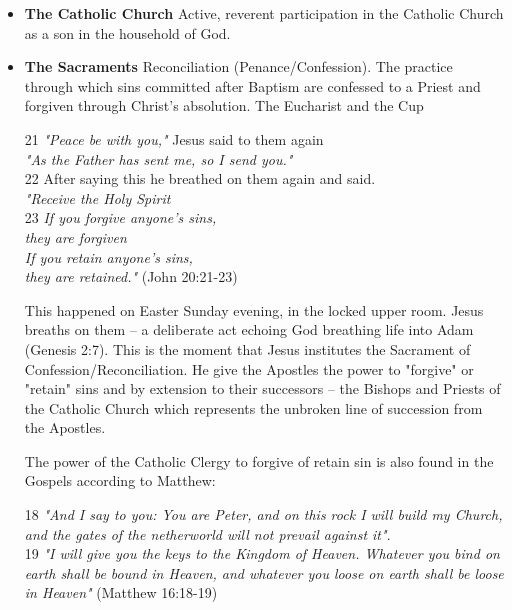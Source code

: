\documentclass[12pt,a4paper]{book}
\begin{document}
\begin{itemize}
\item \textbf{The Catholic Church} Active, reverent participation in the Catholic Church as a son in the household of God.

\item \textbf{The Sacraments} Reconciliation (Penance/Confession).  The practice through which sins committed after Baptism are confessed to a Priest and forgiven through Christ's absolution.  The Eucharist and the Cup

21 \textit{"Peace be with you,"} Jesus said to them again \\ 
\hspace*{10pt} \textit{"As the Father has sent me, so I send you."}\\
22 After saying this he breathed on them again and said. \\
\hspace*{10pt} \textit{"Receive the Holy Spirit} \\
23 \textit{If you forgive anyone's sins, }\\
\hspace*{10pt} \textit{they are forgiven} \\
\hspace*{10pt} \textit{If you retain anyone's sins,} \\
\hspace*{10pt} \textit{they are retained."} (John 20:21-23)

This happened on Easter Sunday evening, in the locked upper room.  Jesus breaths on them -- a deliberate act echoing God breathing life into Adam (Genesis 2:7).  This is the moment that Jesus institutes the Sacrament of Confession/Reconciliation.  He give the Apostles the power to "forgive" or "retain" sins and by extension to their successors -- the Bishops and Priests of the Catholic Church which represents the unbroken line of succession from the Apostles.

The power of the Catholic Clergy to forgive of retain sin is also found in the Gospels according to Matthew:

18 \textit{"And I say to you: You are Peter, and on this rock I will build my Church, and the gates of the netherworld will not prevail against it"}.\\
19 \textit{"I will give you the keys to the Kingdom of Heaven.  Whatever you bind on earth shall be bound in Heaven, and whatever you loose on earth shall be loose in Heaven"} (Matthew 16:18-19)


\end{itemize}
\end{document}
